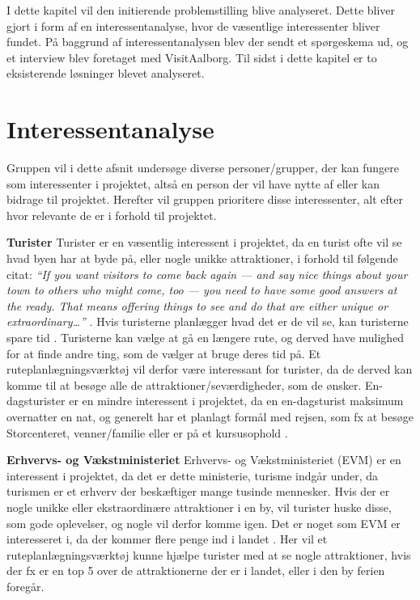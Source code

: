 I dette kapitel vil den initierende problemstilling blive analyseret. Dette bliver gjort i form af en interessentanalyse, hvor de væsentlige interessenter bliver fundet. På baggrund af interessentanalysen blev der sendt et spørgeskema ud, og et interview blev foretaget med VisitAalborg. Til sidst i dette kapitel er to eksisterende løsninger blevet analyseret. 

\section{Interessentanalyse}
Gruppen vil i dette afsnit undersøge diverse personer/grupper, der kan fungere som interessenter i projektet, altså en person der vil have nytte af eller kan bidrage til projektet. Herefter vil gruppen prioritere disse interessenter, alt efter hvor relevante de er i forhold til projektet.

\textbf{Turister}\newline
Turister er en væsentlig interessent i projektet, da en turist ofte vil se hvad byen har at byde på, eller nogle unikke attraktioner, i forhold til følgende citat: \newline 
\textit{“If you want visitors to come back again — and say nice things about your town to others who might come, too — you need to have some good answers at the ready. That means offering things to see and do that are either unique or extraordinary…”} \citep{UniversityOfMinnesota}.\newline 
Hvis turisterne planlægger hvad det er de vil se, kan turisterne spare tid \citep{YouthCentral}. Turisterne kan vælge at gå en længere rute, og derved have mulighed for at finde andre ting, som de vælger at bruge deres tid på. Et ruteplanlægningsværktøj vil derfor være interessant for turister, da de derved kan komme til at besøge alle de attraktioner/seværdigheder, som de ønsker.
En-dagsturister er en mindre interessent i projektet, da en en-dagsturist maksimum overnatter en nat, og generelt har et planlagt formål med rejsen, som fx at besøge Storcenteret, venner/familie eller er på et kursusophold \citep{Faxe}.

\textbf{Erhvervs- og Vækstministeriet}\newline
Erhvervs- og Vækstministeriet (EVM) er en interessent i projektet, da det er dette ministerie, turisme indgår under, da turismen er et erhverv der beskæftiger mange tusinde mennesker. Hvis der er nogle unikke eller ekstraordinære attraktioner i en by, vil turister huske disse, som gode oplevelser, og nogle vil derfor komme igen. Det er noget som EVM er interesseret i, da der kommer flere penge ind i landet \citep{EVM}.
Her vil et ruteplanlægningsværktøj kunne hjælpe turister med at se nogle attraktioner, hvis der fx er en top 5 over de attraktionerne der er i landet, eller i den by ferien foregår.

